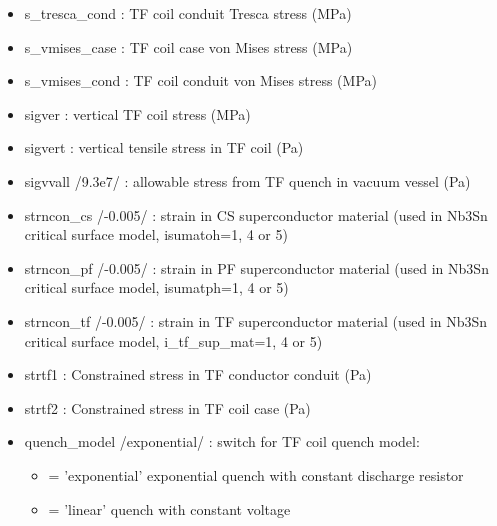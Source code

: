 \documentclass[]{article}
\providecommand{\tightlist}{%
  \setlength{\itemsep}{0pt}\setlength{\parskip}{0pt}}
\begin{document}
\begin{itemize}
\item
  s\_tresca\_cond : TF coil conduit Tresca stress (MPa)
\item
  s\_vmises\_case : TF coil case von Mises stress (MPa)
\item
  s\_vmises\_cond : TF coil conduit von Mises stress (MPa)
\item
  sigver : vertical TF coil stress (MPa)
\item
  sigvert : vertical tensile stress in TF coil (Pa)
\item
  sigvvall /9.3e7/ : allowable stress from TF quench in vacuum vessel
  (Pa)
\item
  strncon\_cs /-0.005/ : strain in CS superconductor material (used in
  Nb3Sn critical surface model, isumatoh=1, 4 or 5)
\item
  strncon\_pf /-0.005/ : strain in PF superconductor material (used in
  Nb3Sn critical surface model, isumatph=1, 4 or 5)
\item
  strncon\_tf /-0.005/ : strain in TF superconductor material (used in
  Nb3Sn critical surface model, i\_tf\_sup\_mat=1, 4 or 5)
\item
  strtf1 : Constrained stress in TF conductor conduit (Pa)
\item
  strtf2 : Constrained stress in TF coil case (Pa)
\item
  quench\_model /exponential/ : switch for TF coil quench model:

  \begin{itemize}
  \tightlist
  \item
    = 'exponential' exponential quench with constant discharge resistor
  \item
    = 'linear' quench with constant voltage
  \end{itemize}


\end{itemize}
\end{document}
